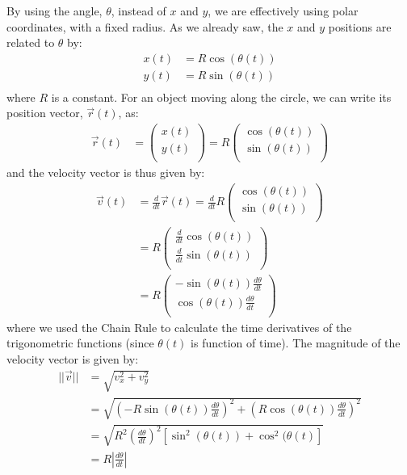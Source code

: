 By using the angle, $\theta$, instead of $x$ and $y$, we are effectively using polar coordinates, with a fixed radius. As we already saw, the $x$ and $y$ positions are related to $\theta$ by:
\begin{align*}
x(t) &= R\cos(\theta(t))\\
y(t) &= R\sin(\theta(t))\\
\end{align*}
where $R$ is a constant. For an object moving along the circle, we can write its position vector, $\vec r(t)$, as:
\begin{align*}
\vec r(t)&= \begin{pmatrix}
           x(t) \\
           y(t) \\
         \end{pmatrix}
         =R \begin{pmatrix}
           \cos(\theta(t)) \\
           \sin(\theta(t)) \\
         \end{pmatrix}
\end{align*}
and the velocity vector is thus given by:
\begin{align*}
\vec v(t) &=\frac{d}{dt}\vec r(t) 
=\frac{d}{dt} R \begin{pmatrix}
           \cos(\theta(t)) \\
           \sin(\theta(t)) \\
         \end{pmatrix} \\
&= R \begin{pmatrix}
           \frac{d}{dt}\cos(\theta(t)) \\
           \frac{d}{dt}\sin(\theta(t)) \\
         \end{pmatrix} \\
 &= R \begin{pmatrix}
           -\sin(\theta(t))\frac{d\theta}{dt} \\
           \cos(\theta(t))\frac{d\theta}{dt} \\
         \end{pmatrix}     
\end{align*}         
where we used the Chain Rule to calculate the time derivatives of the trigonometric functions (since $\theta(t)$ is function of time). The magnitude of the velocity vector is given by:
\begin{align*}
||\vec v|| &=\sqrt{ v_x^2+v_y^2}\\
&=\sqrt{ \left(-R\sin(\theta(t))\frac{d\theta}{dt}\right)^2+\left(R\cos(\theta(t))\frac{d\theta}{dt}\right)^2}\\
&=\sqrt{ R^2\left( \frac{d\theta}{dt}\right)^2[\sin^2(\theta(t))+\cos^2(\theta(t)]}\\
&=R\left |\frac{d\theta}{dt}\right|
\end{align*}

